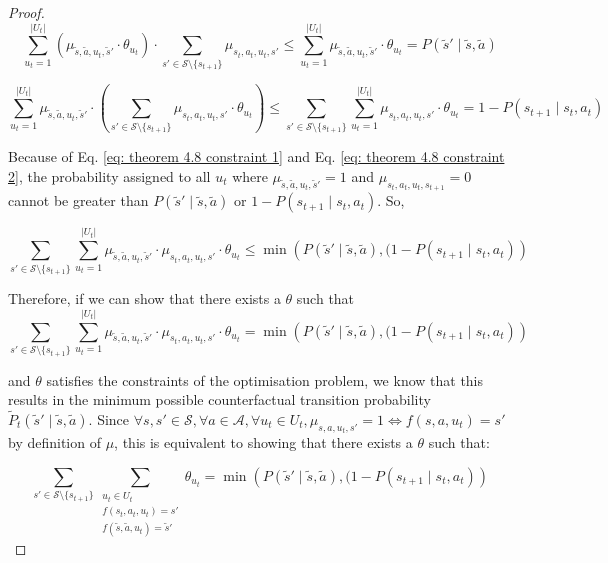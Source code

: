 \begin{proof}
\[
\sum_{u_t = 1}^{|U_t|}(\mu_{\tilde{s}, \tilde{a}, u_t, \tilde{s}'} \cdot \theta_{u_t}) \cdot \sum_{s' \in \mathcal{S}\setminus{\{s_{t+1}\}}}\mu_{s_t, a_t, u_t, s'} \leq \sum_{u_t = 1}^{|U_t|} \mu_{\tilde{s}, \tilde{a}, u_t, \tilde{s}'}\cdot \theta_{u_t} = P(\tilde{s}' \mid \tilde{s}, \tilde{a})
\]

\[
\sum_{u_t = 1}^{|U_t|} \mu_{\tilde{s}, \tilde{a}, u_t, \tilde{s}'} \cdot (\sum_{s' \in \mathcal{S}\setminus{\{s_{t+1}\}}}\mu_{s_t, a_t, u_t, s'} \cdot \theta_{u_t}) \leq  \sum_{s' \in \mathcal{S}\setminus{\{s_{t+1}\}}}\sum_{u_t = 1}^{|U_t|} \mu_{s_t, a_t, u_t, s'} \cdot \theta_{u_t} = 1 - P(s_{t+1} \mid s_t, a_t)
\]

Because of Eq. \eqref{eq: theorem 4.8 constraint 1} and Eq. \eqref{eq: theorem 4.8 constraint 2}, the probability assigned to all $u_t$ where $\mu_{\tilde{s}, \tilde{a}, u_t, \tilde{s}'} = 1$ and $\mu_{s_t, a_t, u_t, s_{t+1}}=0$ cannot be greater than $P(\tilde{s}' \mid \tilde{s}, \tilde{a})$ or $1 - P(s_{t+1} \mid s_t, a_t)$. So,

\[
    \sum_{s' \in \mathcal{S}\setminus{\{s_{t+1}\}}}\sum_{u_t = 1}^{|U_t|} \mu_{\tilde{s}, \tilde{a}, u_t, \tilde{s}'} \cdot \mu_{s_t, a_t, u_t, s'} \cdot \theta_{u_t} \leq \min\left(P(\tilde{s}' \mid \tilde{s}, \tilde{a}), (1 - P(s_{t+1} \mid s_t, a_t)\right)
\]

Therefore, if we can show that there exists a $\theta$ such that
\[
    \sum_{s' \in \mathcal{S}\setminus{\{s_{t+1}\}}}\sum_{u_t = 1}^{|U_t|} \mu_{\tilde{s}, \tilde{a}, u_t, \tilde{s}'} \cdot \mu_{s_t, a_t, u_t, s'} \cdot \theta_{u_t} = \min\left(P(\tilde{s}' \mid \tilde{s}, \tilde{a}), (1 - P(s_{t+1} \mid s_t, a_t)\right)
\]

and $\theta$ satisfies the constraints of the optimisation problem, we know that this results in the minimum possible counterfactual transition probability $\tilde{P}_t(\tilde{s}' \mid \tilde{s}, \tilde{a})$. Since $\forall s,s' \in \mathcal{S}, \forall a \in \mathcal{A}, \forall u_t \in U_t, \mu_{s, a, u_t, s'} = 1 \iff f(s, a, u_t) = s'$ by definition of $\mu$, this is equivalent to showing that there exists a $\theta$ such that:

\[
\sum_{s' \in \mathcal{S}\setminus{\{s_{t+1}\}}}\sum_{\substack{u_t \in U_t \\f(s_t, a_t, u_t) = s' \\ f(\tilde{s}, \tilde{a}, u_t) = \tilde{s}'}} \theta_{u_t}= \min\left(P(\tilde{s}' \mid \tilde{s}, \tilde{a}), (1 - P(s_{t+1} \mid s_t, a_t)\right)
\]


\end{proof}
